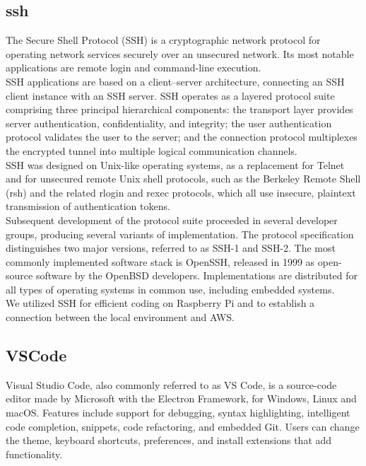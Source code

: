 \subsection{\textbf{ssh}}
\cite{ssh} The Secure Shell Protocol (SSH) is a cryptographic network protocol for operating network services securely over an unsecured network. Its most notable applications are remote login and command-line execution.\\

SSH applications are based on a client–server architecture, connecting an SSH client instance with an SSH server. SSH operates as a layered protocol suite comprising three principal hierarchical components: the transport layer provides server authentication, confidentiality, and integrity; the user authentication protocol validates the user to the server; and the connection protocol multiplexes the encrypted tunnel into multiple logical communication channels.
\\

SSH was designed on Unix-like operating systems, as a replacement for Telnet and for unsecured remote Unix shell protocols, such as the Berkeley Remote Shell (rsh) and the related rlogin and rexec protocols, which all use insecure, plaintext transmission of authentication tokens. \\

Subsequent development of the protocol suite proceeded in several developer groups, producing several variants of implementation. The protocol specification distinguishes two major versions, referred to as SSH-1 and SSH-2. The most commonly implemented software stack is OpenSSH, released in 1999 as open-source software by the OpenBSD developers. Implementations are distributed for all types of operating systems in common use, including embedded systems. 
\\

We utilized SSH for efficient coding on Raspberry Pi and to establish a connection between the local environment and AWS.\\

\subsection{\textbf{VSCode}}
\cite{vscode} Visual Studio Code, also commonly referred to as VS Code, is a source-code editor made by Microsoft with the Electron Framework, for Windows, Linux and macOS. Features include support for debugging, syntax highlighting, intelligent code completion, snippets, code refactoring, and embedded Git. Users can change the theme, keyboard shortcuts, preferences, and install extensions that add functionality.
\\


